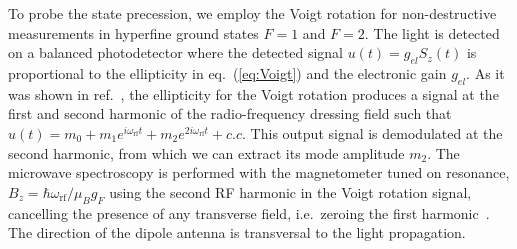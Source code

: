 \documentclass[%
reprint,
 amsmath,amssymb,
 aps,
floatfix,
]{revtex4-1}
\newcommand{\HM}[2][blue]{\textcolor{#1}{ #2}}
\begin{document}
To probe the state precession, we employ the Voigt rotation for non-destructive measurements in hyperfine ground states $F=1$ and $F=2$. 
The light is detected on a balanced photodetector  where the detected signal $u(t)=g_{el} S_z(t)$ is proportional to the ellipticity in eq.~(\ref{eq:Voigt}) and the electronic gain $g_{el}$. As it was shown in ref.~\cite{Tadas19}, the ellipticity for the Voigt rotation produces a signal at the first and second harmonic of the radio-frequency dressing field such that $u(t)=m_0+m_1e^{i\omega_\mathrm{rf}t}+m_2e^{2i \omega_\mathrm{rf}t}+c.c$. This output signal is demodulated at the second harmonic, from which we can extract its mode amplitude $m_2$.
The microwave spectroscopy is performed with the magnetometer tuned on resonance, $B_z=\hbar\omega_\mathrm{rf}/\mu_Bg_F$ using the second RF harmonic in the Voigt rotation signal, cancelling the presence of any transverse field, i.e.\ zeroing the first harmonic~\cite{Tadas19}.
The direction of the dipole antenna is transversal to the light propagation. 

\end{document}
